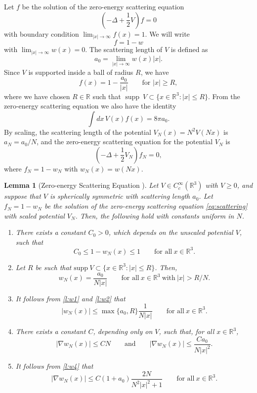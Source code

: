 \documentclass[11pt,a4paper,draft,DIV11]{scrartcl}	%
\newtheorem{lem}[thm]{Lemma}
\newcommand{\R}{\mathds{R}}
\newcommand{\Rbb}{\mathbb{R}}		%
\begin{document}
Let $f$ be the solution of the zero-energy scattering equation
\[
  \left( -\Delta + \frac{1}{2} V \right) f = 0
\]
with boundary condition $\lim_{|x|\to\infty} f(x) = 1$. We will write
\[
  f = 1 - w
\]
with $\lim_{|x|\to\infty} w(x) = 0$. The scattering length of $V$ is defined
as
\[
  a_0 = \lim_{|x| \to \infty} w(x)|x|.
\]
Since $V$ is supported inside a ball of radius $R$, we have
\[
  f(x) = 1 - \frac{a_0}{|x|} \qquad \text{for } |x| \ge R,
\]
where we have chosen $R \in \Rbb$ such that $\operatorname{supp} \ V \subset \{ x \in \R^3: |x| \le R \}$.
From the zero-energy scattering equation we also have the identity
\[
  \int dx \, V(x) f(x) = 8 \pi a_0.
\]
By scaling, the scattering length of the potential $V_N(x) = N^2 V(Nx)$ is
$a_N = a_0/N$, and the zero-energy scattering equation for the potential $V_N$
is
\begin{equation} \label{eq:scattering}
  \left( -\Delta + \frac{1}{2} V_N \right) f_N = 0,
\end{equation}
where $f_N = 1 - w_N$ with $w_N(x) = w(Nx)$.


\begin{lem}[Zero-energy Scattering Equation \cite{ESY2010}] \label{l:w}
  Let $V \in C_c^\infty(\R^3)$ with $V \ge 0$, and suppose that $V$ is
  spherically symmetric with scattering length $a_0$. Let $f_N = 1 - w_N$ be
  the solution of the zero-energy scattering equation \eqref{eq:scattering}
  with scaled potential $V_N$. Then, the following hold with constants
  uniform in $N$.
  \begin{enumerate}
    \item \label{l:w1} There exists a constant $C_0 > 0$, which depends on
    the unscaled potential $V$, such that
      \[
        C_0 \le 1 - w_N(x) \le 1 \qquad \text{for all} \ x \in \R^3.
      \]
    \item \label{l:w2} Let $R$ be such that $\text{supp} \ V \subset \{ x
    \in \R^3 : |x| \le R \}$. Then,
      \[
        w_N(x) = \frac{a_0}{N|x|} \qquad \text{for all} \ x \in \R^3 \
        \text{with} \ |x| > R/N.
      \]
    \item \label{l:w3} It follows from \ref{l:w1} and \ref{l:w2} that
      \[
        |w_N(x)| \le \max\{a_0, R\} \frac{1}{N|x|} \qquad \text{for all} \ x
        \in \R^3.
      \]
    \item \label{l:w4} There exists a constant $C$, depending only on
      $V$, such that, for all $x \in \R^3$,
      \[
        \lvert\nabla w_N(x)\rvert \le C N \qquad \mbox{and} \qquad |\nabla w_N(x)| \le \frac{C a_0}{N |x|^2}.%
      \]
    \item \label{l:w5} It follows from \ref{l:w4} that
      \[
        |\nabla w_N(x)| \le C(1+ a_0) \frac{2N}{N^2|x|^2 + 1}
        \qquad \text{for all} \ x \in \R^3.
      \]
  \end{enumerate}
\end{lem}
\end{document}
